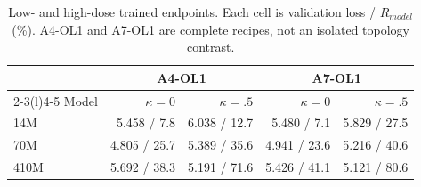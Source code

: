 \begin{table}[t]
\centering
\caption{Low- and high-dose trained endpoints. Each cell is validation loss / $R_{model}$ (\%). A4-OL1 and A7-OL1 are complete recipes, not an isolated topology contrast.}
\label{tab:cross-scale-endpoints}
\small
\begin{tabular}{lrrrr}
\toprule
& \multicolumn{2}{c}{A4-OL1} & \multicolumn{2}{c}{A7-OL1} \\
\cmidrule(lr){2-3}\cmidrule(l){4-5}
Model & $\kappa=0$ & $\kappa=.5$ & $\kappa=0$ & $\kappa=.5$ \\
\midrule
14M & 5.458 / 7.8 & 6.038 / 12.7 & 5.480 / 7.1 & 5.829 / 27.5 \\
70M & 4.805 / 25.7 & 5.389 / 35.6 & 4.941 / 23.6 & 5.216 / 40.6 \\
410M & 5.692 / 38.3 & 5.191 / 71.6 & 5.426 / 41.1 & 5.121 / 80.6 \\
\bottomrule
\end{tabular}
\end{table}
